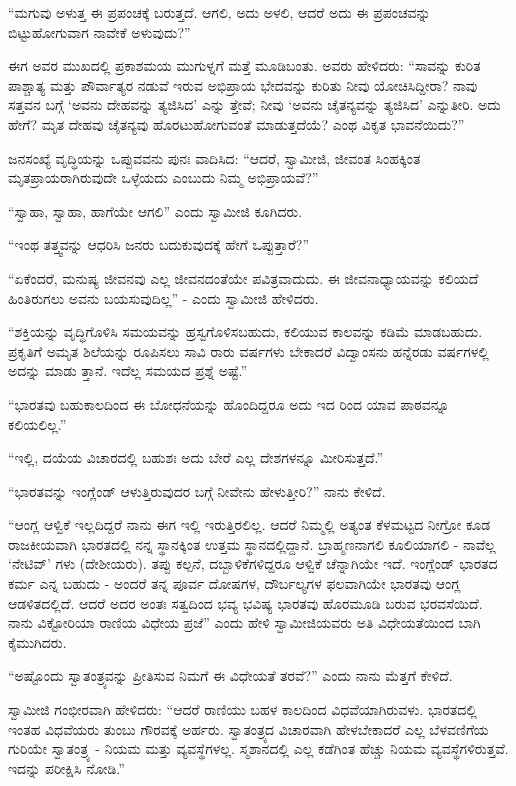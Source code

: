 “ಮಗುವು ಅಳುತ್ತ ಈ ಪ್ರಪಂಚಕ್ಕೆ ಬರುತ್ತದೆ. ಆಗಲಿ, ಅದು ಅಳಲಿ, ಆದರೆ ಅದು ಈ ಪ್ರಪಂಚವನ್ನು ಬಿಟ್ಟುಹೋಗುವಾಗ ನಾವೇಕೆ ಅಳುವುದು?”

ಈಗ ಅವರ ಮುಖದಲ್ಲಿ ಪ್ರಕಾಶಮಯ ಮುಗುಳ್ನಗೆ ಮತ್ತೆ ಮೂಡಿಬಂತು. ಅವರು ಹೇಳಿದರು: “ಸಾವನ್ನು ಕುರಿತ ಪಾಶ್ಚಾತ್ಯ ಮತ್ತು ಪೌರ್ವಾತ್ಯರ ನಡುವೆ ಇರುವ ಅಭಿಪ್ರಾಯ ಭೇದವನ್ನು ಕುರಿತು ನೀವು ಯೋಚಿಸಿದ್ದೀರಾ? ನಾವು ಸತ್ತವನ ಬಗ್ಗೆ ‘ಅವನು ದೇಹವನ್ನು ತ್ಯಜಿಸಿದ’ ಎನ್ನು ತ್ತೇವೆ; ನೀವು ‘ಅವನು ಚೈತನ್ಯವನ್ನು ತ್ಯಜಿಸಿದ’ ಎನ್ನುತೀರಿ. ಅದು ಹೇಗೆ? ಮೃತ ದೇಹವು ಚೈತನ್ಯವು ಹೊರಟುಹೋಗುವಂತೆ ಮಾಡುತ್ತದೆಯೆ? ಎಂಥ ವಿಕೃತ ಭಾವನೆಯಿದು?”

ಜನಸಂಖ್ಯೆ ವೃದ್ಧಿಯನ್ನು ಒಪ್ಪುವವನು ಪುನಃ ವಾದಿಸಿದ: “ಆದರೆ, ಸ್ವಾಮೀಜಿ, ಜೀವಂತ ಸಿಂಹಕ್ಕಿಂತ ಮೃತಪ್ರಾಯರಾಗಿರುವುದೇ ಒಳ್ಳೆಯದು ಎಂಬುದು ನಿಮ್ಮ ಅಭಿಪ್ರಾಯವೆ?”

“ಸ್ವಾಹಾ, ಸ್ವಾಹಾ, ಹಾಗೆಯೇ ಆಗಲಿ” ಎಂದು ಸ್ವಾಮೀಜಿ ಕೂಗಿದರು.

“ಇಂಥ ತತ್ತ್ವವನ್ನು ಆಧರಿಸಿ ಜನರು ಬದುಕುವುದಕ್ಕೆ ಹೇಗೆ ಒಪ್ಪುತ್ತಾರೆ?”

“ಏಕೆಂದರೆ, ಮನುಷ್ಯ ಜೀವನವು ಎಲ್ಲ ಜೀವನದಂತೆಯೇ ಪವಿತ್ರವಾದುದು. ಈ ಜೀವನಾಧ್ಯಾಯವನ್ನು ಕಲಿಯದೆ ಹಿಂತಿರುಗಲು ಅವನು ಬಯಸುವುದಿಲ್ಲ” - ಎಂದು ಸ್ವಾಮೀಜಿ ಹೇಳಿದರು.

“ಶಕ್ತಿಯನ್ನು ವೃದ್ಧಿಗೊಳಿಸಿ ಸಮಯವನ್ನು ಹ್ರಸ್ವಗೊಳಿಸಬಹುದು, ಕಲಿಯುವ ಕಾಲವನ್ನು ಕಡಿಮೆ ಮಾಡಬಹುದು. ಪ್ರಕೃತಿಗೆ ಅಮೃತ ಶಿಲೆಯನ್ನು ರೂಪಿಸಲು ಸಾವಿ ರಾರು ವರ್ಷಗಳು ಬೇಕಾದರೆ ವಿದ್ವಾಂಸನು ಹನ್ನೆರಡು ವರ್ಷಗಳಲ್ಲಿ ಅದನ್ನು ಮಾಡು ತ್ತಾನೆ. ಇದೆಲ್ಲ ಸಮಯದ ಪ್ರಶ್ನೆ ಅಷ್ಟೆ.”

“ಭಾರತವು ಬಹುಕಾಲದಿಂದ ಈ ಬೋಧನೆಯನ್ನು ಹೊಂದಿದ್ದರೂ ಅದು ಇದ ರಿಂದ ಯಾವ ಪಾಠವನ್ನೂ ಕಲಿಯಲಿಲ್ಲ.”

“ಇಲ್ಲಿ, ದಯೆಯ ವಿಚಾರದಲ್ಲಿ ಬಹುಶಃ ಅದು ಬೇರೆ ಎಲ್ಲ ದೇಶಗಳನ್ನೂ ಮೀರಿಸುತ್ತದೆ.”

“ಭಾರತವನ್ನು ಇಂಗ್ಲೆಂಡ್ ಆಳುತ್ತಿರುವುದರ ಬಗ್ಗೆ ನೀವೇನು ಹೇಳುತ್ತೀರಿ?” ನಾನು ಕೇಳಿದೆ.

“ಆಂಗ್ಲ ಆಳ್ವಿಕೆ ಇಲ್ಲದಿದ್ದರೆ ನಾನು ಈಗ ಇಲ್ಲಿ ಇರುತ್ತಿರಲಿಲ್ಲ. ಆದರೆ ನಿಮ್ಮಲ್ಲಿ ಅತ್ಯಂತ ಕೆಳಮಟ್ಟದ ನೀಗ್ರೋ ಕೂಡ ರಾಜಕೀಯವಾಗಿ ಭಾರತದಲ್ಲಿ ನನ್ನ ಸ್ಥಾನಕ್ಕಿಂತ ಉತ್ತಮ ಸ್ಥಾನದಲ್ಲಿದ್ದಾನೆ. ಬ್ರಾಹ್ಮಣನಾಗಲಿ ಕೂಲಿಯಾಗಲಿ - ನಾವೆಲ್ಲ ‘ನೇಟಿವ್’ ಗಳು (ದೇಶೀಯರು). ತಪ್ಪು ಕಲ್ಪನೆ, ದಬ್ಬಾಳಿಕೆಗಳಿದ್ದರೂ ಆಳ್ವಿಕೆ ಚೆನ್ನಾಗಿಯೇ ಇದೆ. ಇಂಗ್ಲೆಂಡ್ ಭಾರತದ ಕರ್ಮ ಎನ್ನ ಬಹುದು - ಅಂದರೆ ತನ್ನ ಪೂರ್ವ ದೋಷಗಳ, ದೌರ್ಬಲ್ಯಗಳ ಫಲವಾಗಿಯೇ ಭಾರತವು ಆಂಗ್ಲ ಆಡಳಿತದಲ್ಲಿದೆ. ಆದರೆ ಅದರ ಅಂತಃ ಸತ್ವದಿಂದ ಭವ್ಯ ಭವಿಷ್ಯ ಭಾರತವು ಹೊರಮೂಡಿ ಬರುವ ಭರವಸೆಯಿದೆ. ನಾನು ವಿಕ್ಟೋರಿಯಾ ರಾಣಿಯ ವಿಧೇಯ ಪ್ರಜೆ” ಎಂದು ಹೇಳಿ ಸ್ವಾಮೀಜಿಯವರು ಅತಿ ವಿಧೇಯತೆಯಿಂದ ಬಾಗಿ ಕೈಮುಗಿದರು.

“ಅಷ್ಟೊಂದು ಸ್ವಾತಂತ್ರ್ಯವನ್ನು ಪ್ರೀತಿಸುವ ನಿಮಗೆ ಈ ವಿಧೇಯತೆ ತರವೆ?” ಎಂದು ನಾನು ಮೆತ್ತಗೆ ಕೇಳಿದೆ.

ಸ್ವಾಮೀಜಿ ಗಂಭೀರವಾಗಿ ಹೇಳಿದರು: “ಆದರೆ ರಾಣಿಯು ಬಹಳ ಕಾಲದಿಂದ ವಿಧವೆಯಾಗಿರುವಳು. ಭಾರತದಲ್ಲಿ ಇಂತಹ ವಿಧವೆಯರು ತುಂಬು ಗೌರವಕ್ಕೆ ಅರ್ಹರು. ಸ್ವಾತಂತ್ರ್ಯದ ವಿಚಾರವಾಗಿ ಹೇಳಬೇಕಾದರೆ ಎಲ್ಲ ಬೆಳವಣಿಗೆಯ ಗುರಿಯೇ ಸ್ವಾತಂತ್ರ್ಯ - ನಿಯಮ ಮತ್ತು ವ್ಯವಸ್ಥೆಗಳಲ್ಲ. ಸ್ಮಶಾನದಲ್ಲಿ ಎಲ್ಲ ಕಡೆಗಿಂತ ಹೆಚ್ಚು ನಿಯಮ ವ್ಯವಸ್ಥೆಗಳಿರುತ್ತವೆ. ಇದನ್ನು ಪರೀಕ್ಷಿಸಿ ನೋಡಿ.”


